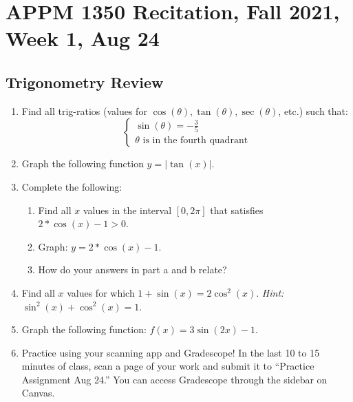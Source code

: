 \documentclass[12pt]{article}
\begin{document}
\section*{APPM 1350 Recitation, Fall 2021, Week  1, Aug 24}
\subsection*{Trigonometry Review}
\begin{enumerate}
    \item Find all trig-ratios (values for $\cos(\theta), \tan(\theta), \sec(\theta)$, etc.) such that:
    \[
        \begin{cases}
            \sin(\theta) = -\frac{3}{5}\\
            \text{$\theta$ is in the fourth quadrant}
        \end{cases}
    \]
    
    \item Graph the following function $y = |\tan (x)|$.
    
    \item Complete the following:
    \begin{enumerate}[label = \alph*.]
        \item Find all $x$ values in the interval $[0,2\pi]$ that satisfies $2*\cos(x) - 1 > 0$.
        
        \item Graph: $y = 2*\cos(x) - 1$.
        
        \item How do your answers in part a and b relate?
    \end{enumerate}
    
    \item Find all $x$ values for which $1 + \sin(x) = 2\cos^2(x).$ \newline
    \emph{Hint:} $\sin^2(x) + \cos^2(x) = 1$.
    
    \item Graph the following function: $f(x) = 3\sin(2x) - 1$.
    
    \item Practice using your scanning app and Gradescope! In the last 10 to 15 minutes of class, scan a page of your work and submit it to ``Practice Assignment Aug 24.'' You can access Gradescope through the sidebar on Canvas.

\end{enumerate}
\end{document}
